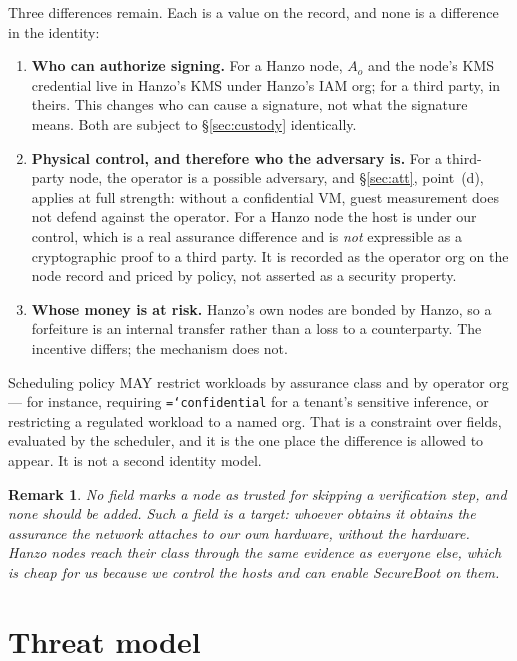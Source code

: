 \documentclass[11pt,a4paper]{article}
\newtheorem{remark}[definition]{Remark}
\newcommand{\code}[1]{\texttt{\hyphenchar\font=`\-\relax #1}}
\begin{document}
Three differences remain. Each is a value on the record, and none is a difference
in the identity:

\begin{enumerate}[label=\textbf{D\arabic*.},leftmargin=2.6em]
\item \textbf{Who can authorize signing.} For a Hanzo node, $A_o$ and the node's
  KMS credential live in Hanzo's KMS under Hanzo's IAM org; for a third party, in
  theirs. This changes who can cause a signature, not what the signature means.
  Both are subject to \S\ref{sec:custody} identically.
\item \textbf{Physical control, and therefore who the adversary is.} For a
  third-party node, the operator is a possible adversary, and \S\ref{sec:att},
  point~(d), applies at full strength: without a confidential VM, guest measurement
  does not defend against the operator. For a Hanzo node the host is under our
  control, which is a real assurance difference and is \emph{not} expressible as a
  cryptographic proof to a third party. It is recorded as the operator org on the
  node record and priced by policy, not asserted as a security property.
\item \textbf{Whose money is at risk.} Hanzo's own nodes are bonded by Hanzo, so a
  forfeiture is an internal transfer rather than a loss to a counterparty. The
  incentive differs; the mechanism does not.
\end{enumerate}

Scheduling policy MAY restrict workloads by assurance class and by operator org ---
for instance, requiring \code{confidential} for a tenant's sensitive inference, or
restricting a regulated workload to a named org. That is a constraint over fields,
evaluated by the scheduler, and it is the one place the difference is allowed to
appear. It is not a second identity model.

\begin{remark}
No field marks a node as trusted for skipping a verification step, and none should
be added. Such a field is a target: whoever obtains it obtains the assurance the
network attaches to our own hardware, without the hardware. Hanzo nodes reach their
class through the same evidence as everyone else, which is cheap for us because we
control the hosts and can enable SecureBoot on them.
\end{remark}

\section{Threat model}
\label{sec:threat}
\end{document}
